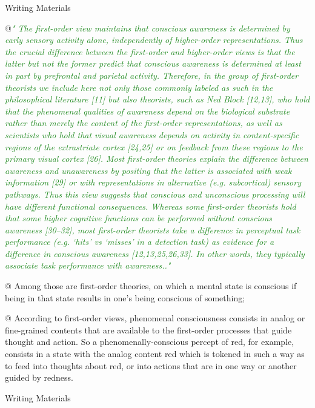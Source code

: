 \documentclass[utf8]{article}
\newenvironment{writingMaterials}
			{	
				\begin{tcolorbox}[size=small, colframe=black!20!white, toprule=1mm]
					Writing Materials
				\end{tcolorbox}

				\begin{easylist}[itemize]		
			}
			{
				\end{easylist}
				\begin{tcolorbox}[size=small, bottomrule=1mm, halign=flush right, colframe=black!20!white]
					Writing Materials
				\end{tcolorbox}			
			}
\newcommand{\rewrite}[1]{\textcolor{ForestGreen}{\textit{"#1"}}\newline}
\begin{document}
			\begin{writingMaterials}
				@\rewrite{
					The ﬁrst-order view maintains that conscious awareness is determined by early sensory activity alone, independently of higher-order representations. Thus the crucial difference between the ﬁrst-order and higher-order views is that the latter but not the former predict that conscious awareness is determined at least in part by prefrontal and parietal activity. Therefore, in the group of ﬁrst-order theorists we include here not only those commonly labeled as such in the philosophical literature [11] but also theorists, such as Ned Block [12,13], who hold that the phenomenal qualities of awareness depend on the biological substrate rather than merely the content of the ﬁrst-order representations, as well as scientists who hold that visual awareness depends on activity in content-speciﬁc regions of the extrastriate cortex [24,25] or on feedback from these regions to the primary visual cortex [26]. Most ﬁrst-order theories explain the difference between awareness and unawareness by positing that the latter is associated with weak information [29] or with representations in alternative (e.g. subcortical) sensory pathways. Thus this view suggests that conscious and unconscious processing will have different functional consequences. Whereas some ﬁrst-order theorists hold that some higher cognitive functions can be performed without conscious awareness [30–32], most ﬁrst-order theorists take a difference in perceptual task performance (e.g. ‘hits’ vs ‘misses’ in a detection task) as evidence for a difference in conscious awareness [12,13,25,26,33]. In other words, they typically associate task performance with awareness..} \cite{lau2011empirical}
				
				@ Among those are first-order theories, on which a mental state is conscious if being in that state results in one’s being conscious of something;
				
				
				@  According to first-order views, phenomenal consciousness consists in analog or fine-grained contents that are available to the first-order processes that guide thought and action. So a phenomenally-conscious percept of red, for example, consists in a state with the analog content red which is tokened in such a way as to feed into thoughts about red, or into actions that are in one way or another guided by redness. 
				
			\end{writingMaterials}
		
		
		
\end{document}
